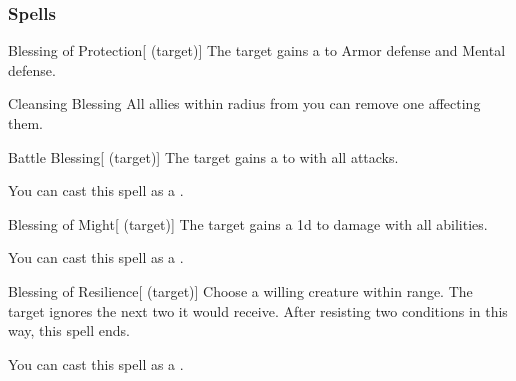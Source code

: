 \subsubsection{Spells}


\lowercase{\hypertarget{spell:Blessing of Protection}{}}\label{spell:Blessing of Protection}
\begin{attuneability}[\nth{1}]{\hypertarget{spell:Blessing of Protection}{Blessing of Protection}}[ (target)]
The target gains a   to Armor defense and Mental defense.
\end{attuneability}
\vspace{0.25em}



\lowercase{\hypertarget{spell:Cleansing Blessing}{}}\label{spell:Cleansing Blessing}
\begin{apability}[\nth{1}]{\hypertarget{spell:Cleansing Blessing}{Cleansing Blessing}}
All allies within \arealarge radius from you can remove one  affecting them.
\end{apability}
\vspace{0.25em}



\lowercase{\hypertarget{spell:Battle Blessing}{}}\label{spell:Battle Blessing}
\begin{attuneability}[\nth{2}]{\hypertarget{spell:Battle Blessing}{Battle Blessing}}[ (target)]
The target gains a   to  with all attacks.

You can cast this spell as a .
\end{attuneability}
\vspace{0.25em}



\lowercase{\hypertarget{spell:Blessing of Might}{}}\label{spell:Blessing of Might}
\begin{attuneability}[\nth{3}]{\hypertarget{spell:Blessing of Might}{Blessing of Might}}[ (target)]
The target gains a \plus1d  to damage with all abilities.

You can cast this spell as a .
\end{attuneability}
\vspace{0.25em}



\lowercase{\hypertarget{spell:Blessing of Resilience}{}}\label{spell:Blessing of Resilience}
\begin{attuneability}[\nth{3}]{\hypertarget{spell:Blessing of Resilience}{Blessing of Resilience}}[ (target)]
Choose a willing creature within \rngclose range.
The target ignores the next two  it would receive.
After resisting two conditions in this way, this spell ends.

You can cast this spell as a .
\end{attuneability}
\vspace{0.25em}



